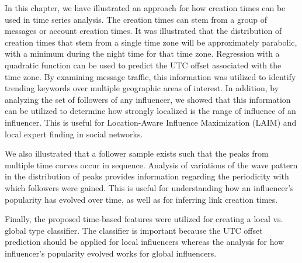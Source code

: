 In this chapter, we have illustrated an approach for how creation times can be used in time series analysis. The creation times can stem from a group of messages or account creation times. It was illustrated that the distribution of creation times that stem from a single time zone %
will be approximately %
parabolic, with a minimum during the night time for that %
time zone. %
Regression with a quadratic function can be used to predict the UTC offset associated with the time zone. 
By examining message traffic, this information was utilized to identify trending keywords over %
multiple geographic %
areas of interest. 
In addition, by analyzing the set of followers of any influencer, we showed that this information can be utilized to determine how strongly localized is the range of influence
of an influencer. %
This is useful for Location-Aware Influence Maximization (LAIM) and local expert finding in social networks. 

We also illustrated that a follower sample exists such that the peaks from multiple time curves occur in sequence. 
Analysis of variations of %
the wave pattern in the distribution of peaks
provides information %
regarding the periodicity with which followers were gained. This is useful for understanding how an influencer's popularity has evolved over time, as well as for inferring link creation times.%

Finally, the proposed time-based features were utilized for creating a local vs. global type classifier. The classifier is important because the UTC offset prediction should be applied for local influencers whereas the analysis for how influencer's popularity evolved %
works for global influencers.
